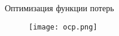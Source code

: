 
\begin{frame}{Оптимизация функции потерь}
\begin{figure}
\centering
\texttt{[image: ocp.png]}
\end{figure}
\end{frame}